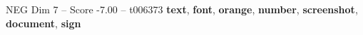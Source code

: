 \begin{textsample}{NEG Dim 7 – Score -7.00 – t006373}  \label{ex:f7_neg_015}
\textbf{text}, \textbf{font}, \textbf{orange}, \textbf{number}, \textbf{screenshot}, \textbf{document}, \textbf{sign}

\end{textsample}
